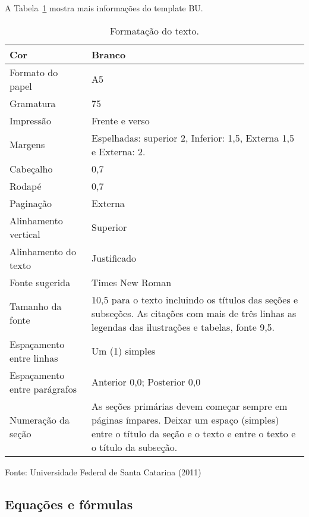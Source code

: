 A Tabela~\ref{tab:a} mostra mais informações do template BU.

\begin{table}[!htb]
\begin{center}
    \caption{Formatação do texto.}\label{tab:a}
    \begin{tabular}{ p{3cm} | p{6cm} }
        \hline
        Cor & Branco \\
        \hline
        Formato do papel & A5 \\
        \hline
        Gramatura & 75 \\
        \hline
        Impressão & Frente e verso \\
        \hline
        Margens & Espelhadas: superior 2, Inferior: 1,5, Externa 1,5 e Externa: 2. \\
        \hline
        Cabeçalho & 0,7 \\
        \hline
        Rodapé & 0,7 \\
        \hline
        Paginação & Externa \\
        \hline
        Alinhamento vertical & Superior \\
        \hline
        Alinhamento do texto & Justificado \\
        \hline
        Fonte sugerida & Times New Roman  \\
        \hline
        Tamanho da fonte & 10,5 para o texto
        incluindo os títulos das seções e subseções.
        As citações com mais de três linhas
        as legendas das ilustrações e tabelas, fonte 9,5. \\
        \hline
        Espaçamento entre linhas & Um (1) simples \\
        \hline
        Espaçamento entre parágrafos & Anterior 0,0; Posterior 0,0 \\
        \hline
        Numeração da seção & As seções primárias devem começar
        sempre em páginas ímpares.
        Deixar um espaço (simples) entre o título da seção
        e o texto e entre o texto e o título da subseção. \\
        \hline
    \end{tabular}
\end{center}
Fonte: Universidade Federal de Santa Catarina (2011)
\end{table}

\subsection{Equações e fórmulas}

